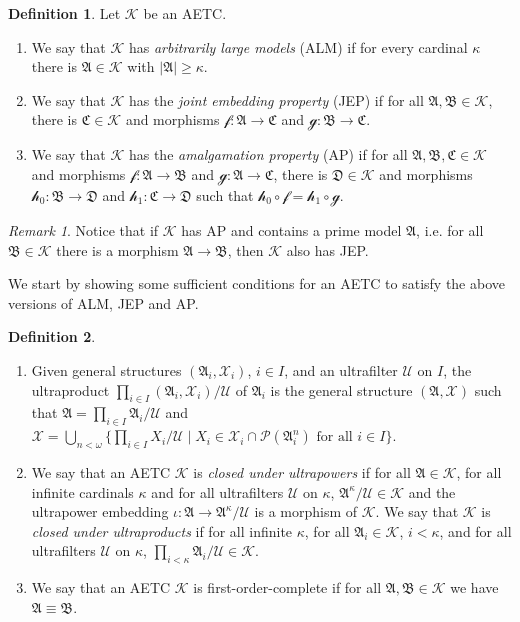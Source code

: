 \documentclass[a4paper]{amsart}
\theoremstyle{definition}
\newtheorem{definition}{Definition}[section]
\theoremstyle{remark}
\newtheorem*{remark}{Remark}
\newcommand{\A}{\mathcal{A}}
\newcommand{\B}{\mathcal{B}}
\newcommand{\C}{\mathcal{C}}
\newcommand{\D}{\mathcal{D}}
\newcommand{\U}{\mathcal{U}}
\DeclareMathOperator{\Pow}{\wp}
\newcommand{\K}{\mathcal{K}}
\newcommand{\X}{\mathcal{X}}
\theoremstyle{definition}
\renewcommand{\A}{\mathfrak{A}}
\renewcommand{\B}{\mathfrak{B}}
\renewcommand{\C}{\mathfrak{C}}
\renewcommand{\D}{\mathfrak{D}}
\newcommand{\f}{\mathcal{f}}
\newcommand{\g}{\mathcal{g}}
\newcommand{\h}{\mathcal{h}}
\renewcommand{\Pow}{\mathcal{P}}
\begin{document}
\begin{definition}
    Let $\K$ be an AETC.
    \begin{enumerate}
        \item We say that $\K$ has \emph{arbitrarily large models} (ALM) if for every cardinal $\kappa$ there is $\A\in\K$ with $|\A|\geq\kappa$.        
        \item We say that $\K$ has the \emph{joint embedding property} (JEP) if for all $\A,\B\in\K$, there is $\C\in\K$ and morphisms $\f\colon\A\to\C$ and $\g\colon\B\to\C$.
        \item We say that $\K$ has the \emph{amalgamation property} (AP) if for all $\A,\B,\C\in\K$ and morphisms $\f\colon\A\to\B$ and $\g\colon\A\to\C$, there is $\D\in\K$ and morphisms $\h_0\colon\B\to\D$ and $\h_1\colon\C\to\D$ such that $\h_0\circ\f = \h_1\circ\g$.
    \end{enumerate}
\end{definition}

\begin{remark}
    Notice that if $\K$ has AP and contains a prime model $\A$, i.e. for all $\B\in\K$ there is a morphism $\A\to\B$, then $\K$ also has JEP.
\end{remark}

We start by showing some sufficient conditions for an AETC to satisfy the above versions of ALM, JEP and AP.

\begin{definition}\quad
    \begin{enumerate}
        \item Given general structures $(\A_i,\X_i)$, $i\in I$, and an ultrafilter $\U$ on $I$, the ultraproduct $\prod_{i\in I}(\A_i,\X_i)/\U$ of $\A_i$ is the general structure $(\A,\X)$ such that $\A = \prod_{i\in I}\A_i/\U$ and $\X = \bigcup_{n<\omega}\{\prod_{i\in I}X_i/\U \mid \text{$X_i\in\X_i\cap\Pow(\A_i^n)$ for all $i\in I$}\}$.
        \item We say that an AETC $\K$ is \emph{closed under ultrapowers} if for all $\A\in\K$, for all infinite cardinals $\kappa$ and for all ultrafilters $\U$ on $\kappa$, $\A^\kappa/\U\in\K$ and the ultrapower embedding $\iota\colon\A\to\A^\kappa/\U$ is a morphism of $\K$. We say that $\K$ is \emph{closed under ultraproducts} if for all infinite $\kappa$, for all $\A_i\in\K$, $i<\kappa$, and for all ultrafilters $\U$ on $\kappa$, $\prod_{i<\kappa}\A_i/\U\in\K$.
        \item We say that an AETC $\K$ is first-order-complete if for all $\A,\B\in\K$ we have $\A\equiv\B$.
    \end{enumerate}
\end{definition}
\end{document}
